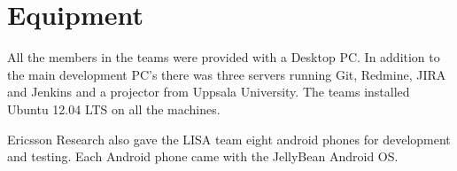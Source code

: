 \section{Equipment}

All the members in the teams were provided with a Desktop PC. In addition to the main development PC's there was three servers running Git, Redmine, JIRA and Jenkins and a projector from Uppsala University. The teams installed Ubuntu 12.04 LTS on all the machines.

Ericsson Research also gave the LISA team eight android phones for development and testing. Each Android phone came with the JellyBean Android OS. 




